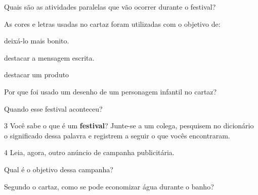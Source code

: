 \begin{escolha}
\begin{escolha}
\begin{escolha}

\item Quais são as atividades paralelas que vão ocorrer durante o festival?


\item As cores e letras usadas no cartaz foram utilizadas com o objetivo de:

\begin{boxlist}
\boxitem[] deixá-lo mais bonito.

\boxitem[\rosa{X}] destacar a mensagem escrita.

\boxitem[] destacar um produto
\end{boxlist}

\item Por que foi usado um desenho de um personagem infantil no cartaz?


\item Quando esse festival aconteceu? 

\end{escolha}

\num{3} Você sabe o que é um \textbf{festival}? Junte-se a um colega,
pesquisem no dicionário o significado dessa palavra e registrem a seguir 
o que vocês encontraram.


\num{4} Leia, agora, outro anúncio de campanha publicitária.


\begin{escolha}
\item Qual é o objetivo dessa campanha?


\item Segundo o cartaz, como se pode economizar água durante o banho?


\end{escolha}
\end{escolha}
\end{escolha}
